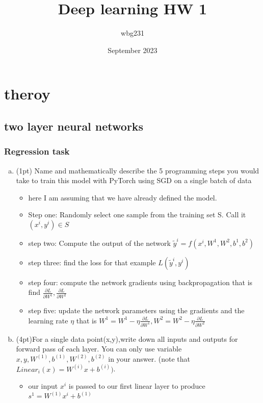 \documentclass{article}
\title{Deep learning HW 1}
\author{wbg231 }
\date{September 2023}
\begin{document}
\maketitle

\section{theroy}
\subsection{two layer neural networks}
\subsubsection{Regression task}
\begin{enumerate}[(a)] %
\item (1pt) Name and mathematically describe the 5 programming steps you would take to train this model with PyTorch using SGD on a single batch of data
\begin{itemize}
    \color{blue}
    \item here I am assuming that we have already defined the model. 
    \item Step one: Randomly select one sample from the training set S. Call it $(x^i, y^i)\in S$
    \item step two: Compute the output of the network $\tilde{y}^i = f(x^i, W^1, W^2, b^1, b^2)$
    \item step three: find the loss for that example $L(\tilde{y}^i, y^i)$
    \item step four: compute the network gradients using backpropagation that is find $\frac{\partial L}{\partial W^1}, \frac{\partial L}{\partial W^2}$
    \item step five: update the network parameters using the gradients and the learning rate $\eta$ that is $W^1 = W^1 - \eta \frac{\partial L}{\partial W^1}, W^2 = W^2 - \eta \frac{\partial L}{\partial W^2}$
\end{itemize}
\item (4pt)For a single data point(x,y),write down all inputs and outputs for forward pass of each layer. You can only use variable $x,y,W^{(1)},b^{(1)},W^{(2)},b^{(2)}$ in your answer. (note that $ Linear_i(x)=W^{(i)}x+b^{(i)}) $.
\begin{itemize}
    \color{blue}
    \item our input $x^i$ is passed to our first linear layer to produce $s^{1} = W^{(1)}x^{i} + b^{(1)}$

\end{itemize}
\end{enumerate}
\end{document}
